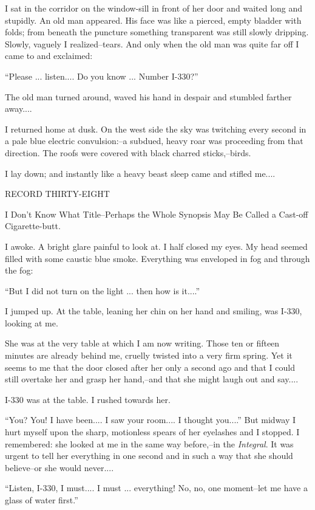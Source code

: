 \documentclass[11pt,openany]{book}
\begin{document}
I sat in the corridor on the window-sill in front of her door and waited long and stupidly. An old man appeared. His face was like a pierced, empty bladder with folds; from beneath the puncture something transparent was still slowly dripping. Slowly, vaguely I realized--tears. And only when the old man was quite far off I came to and exclaimed:

``Please ... listen.... Do you know ... Number I-330?''

The old man turned around, waved his hand in despair and stumbled farther away....

I returned home at dusk. On the west side the sky was twitching every second in a pale blue electric convulsion:--a subdued, heavy roar was proceeding from that direction. The roofs were covered with black charred sticks,--birds.

I lay down; and instantly like a heavy beast sleep came and stifled me....

\begin{center}\textsc{RECORD THIRTY-EIGHT}\end{center}

I Don't Know What Title--Perhaps the Whole Synopsis May Be Called a Cast-off Cigarette-butt.

I awoke. A bright glare painful to look at. I half closed my eyes. My head seemed filled with some caustic blue smoke. Everything was enveloped in fog and through the fog:

``But I did not turn on the light ... then how is it....''

I jumped up. At the table, leaning her chin on her hand and smiling, was I-330, looking at me.

She was at the very table at which I am now writing. Those ten or fifteen minutes are already behind me, cruelly twisted into a very firm spring. Yet it seems to me that the door closed after her only a second ago and that I could still overtake her and grasp her hand,--and that she might laugh out and say....

I-330 was at the table. I rushed towards her.

``You? You! I have been.... I saw your room.... I thought you....'' But midway I hurt myself upon the sharp, motionless spears of her eyelashes and I stopped. I remembered: she looked at me in the same way before,--in the \emph{Integral}. It was urgent to tell her everything in one second and in such a way that she should believe--or she would never....

``Listen, I-330, I must.... I must ... everything! No, no, one moment--let me have a glass of water first.''
\end{document}
